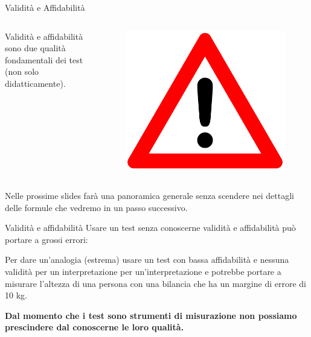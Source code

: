 \documentclass[
  ignorenonframetext,
]{beamer}
\begin{document}
\begin{frame}{Validità e Affidabilità}
\label{validituxe0-e-affidabilituxe0-1}
\small
\begin{columns}
Validità e affidabilità sono due qualità fondamentali dei test (non solo didatticamente).
\begin{figure}
\includegraphics[scale=0.05]{Figures/triangle.png}
\end{figure}
\end{columns}

\vfill

Nelle prossime slides farà una panoramica generale senza scendere nei
dettagli delle formule che vedremo in un passo successivo.
\end{frame}

\begin{frame}{Validità e affidabilità}
\label{validituxe0-e-affidabilituxe0-2}
Usare un test senza conoscerne validità e affidabilità può portare a
grossi errori:

Per dare un'analogia (estrema) usare un test con bassa affidabilità e
nessuna validità per un interpretazione per un'interpretazione e
potrebbe portare a misurare l'altezza di una persona con una bilancia
che ha un margine di errore di 10 kg.

\textbf{Dal momento che i test sono strumenti di misurazione non
possiamo prescindere dal conoscerne le loro qualità.}
\end{frame}
\end{document}
